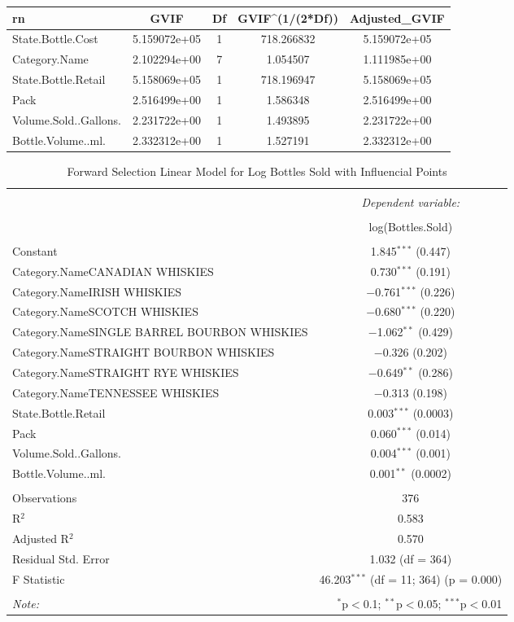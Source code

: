 \documentclass[]{elsarticle} %
\begin{document}
\begin{longtable}[]{@{}lcccc@{}}
\toprule
rn & GVIF & Df & GVIF\^{}(1/(2*Df)) & Adjusted\_GVIF\tabularnewline
\midrule
\endhead
State.Bottle.Cost & 5.159072e+05 & 1 & 718.266832 &
5.159072e+05\tabularnewline
Category.Name & 2.102294e+00 & 7 & 1.054507 &
1.111985e+00\tabularnewline
State.Bottle.Retail & 5.158069e+05 & 1 & 718.196947 &
5.158069e+05\tabularnewline
Pack & 2.516499e+00 & 1 & 1.586348 & 2.516499e+00\tabularnewline
Volume.Sold..Gallons. & 2.231722e+00 & 1 & 1.493895 &
2.231722e+00\tabularnewline
Bottle.Volume..ml. & 2.332312e+00 & 1 & 1.527191 &
2.332312e+00\tabularnewline
\bottomrule
\end{longtable}

\begin{table}[!htbp] \centering 
  \caption{Forward Selection Linear Model for Log Bottles Sold with Influencial Points} 
  \label{} 
\normalsize 
\begin{tabular}{@{\extracolsep{5pt}}lc} 
\\[-1.8ex]\hline 
\hline \\[-1.8ex] 
 & \multicolumn{1}{c}{\textit{Dependent variable:}} \\ 
\cline{2-2} 
\\[-1.8ex] & log(Bottles.Sold) \\ 
\hline \\[-1.8ex] 
 Constant & 1.845$^{***}$ (0.447) \\ 
  Category.NameCANADIAN WHISKIES & 0.730$^{***}$ (0.191) \\ 
  Category.NameIRISH WHISKIES & $-$0.761$^{***}$ (0.226) \\ 
  Category.NameSCOTCH WHISKIES & $-$0.680$^{***}$ (0.220) \\ 
  Category.NameSINGLE BARREL BOURBON WHISKIES & $-$1.062$^{**}$ (0.429) \\ 
  Category.NameSTRAIGHT BOURBON WHISKIES & $-$0.326 (0.202) \\ 
  Category.NameSTRAIGHT RYE WHISKIES & $-$0.649$^{**}$ (0.286) \\ 
  Category.NameTENNESSEE WHISKIES & $-$0.313 (0.198) \\ 
  State.Bottle.Retail & 0.003$^{***}$ (0.0003) \\ 
  Pack & 0.060$^{***}$ (0.014) \\ 
  Volume.Sold..Gallons. & 0.004$^{***}$ (0.001) \\ 
  Bottle.Volume..ml. & 0.001$^{**}$ (0.0002) \\ 
 \hline \\[-1.8ex] 
Observations & 376 \\ 
R$^{2}$ & 0.583 \\ 
Adjusted R$^{2}$ & 0.570 \\ 
Residual Std. Error & 1.032 (df = 364) \\ 
F Statistic & 46.203$^{***}$ (df = 11; 364)  (p = 0.000) \\ 
\hline 
\hline \\[-1.8ex] 
\textit{Note:}  & \multicolumn{1}{r}{$^{*}$p$<$0.1; $^{**}$p$<$0.05; $^{***}$p$<$0.01} \\ 
\end{tabular} 
\end{table}
\end{document}
